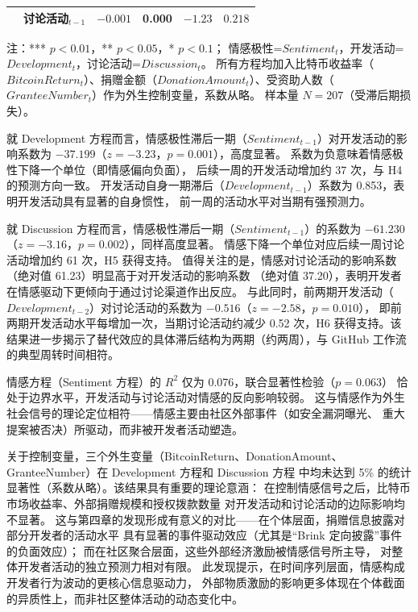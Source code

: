 \begin{table}[htbp]
\begin{tabularx}{\textwidth}{p{3.2cm}p{3.2cm}XXXX}
                      & 讨论活动$_{t-1}$   & $-0.001$ & 0.000 & $-1.23$ & $0.218$ \\
        \bottomrule
    \end{tabularx}
    \begin{minipage}{\textwidth}
        \vspace{0.3em}
        \footnotesize 注：*** $p < 0.01$，** $p < 0.05$，* $p < 0.1$；
              情感极性=$Sentiment_t$，开发活动=$Development_t$，讨论活动=$Discussion_t$。
              所有方程均加入比特币收益率（$BitcoinReturn_t$）、捐赠金额（$DonationAmount_t$）、受资助人数（$GranteeNumber_t$）作为外生控制变量，系数从略。
              样本量 $N = 207$（受滞后期损失）。
    \end{minipage}
\end{table}

就 Development 方程而言，情感极性滞后一期（$Sentiment_{t-1}$）对开发活动的影响系数为
$-37.199$（$z = -3.23$，$p = 0.001$），高度显著。
系数为负意味着情感极性下降一个单位（即情感偏向负面），
后续一周的开发活动增加约 37 次，与 H4 的预测方向一致。
开发活动自身一期滞后（$Development_{t-1}$）系数为 0.853，表明开发活动具有显著的自身惯性，
前一周的活动水平对当期有强预测力。

就 Discussion 方程而言，情感极性滞后一期（$Sentiment_{t-1}$）的系数为
$-61.230$（$z = -3.16$，$p = 0.002$），同样高度显著。
情感下降一个单位对应后续一周讨论活动增加约 61 次，H5 获得支持。
值得关注的是，情感对讨论活动的影响系数（绝对值 61.23）明显高于对开发活动的影响系数
（绝对值 37.20），表明开发者在情感驱动下更倾向于通过讨论渠道作出反应。
与此同时，前两期开发活动（$Development_{t-2}$）对讨论活动的系数为
$-0.516$（$z = -2.58$，$p = 0.010$），
即前两期开发活动水平每增加一次，当期讨论活动约减少 0.52 次，H6 获得支持。该结果进一步揭示了替代效应的具体滞后结构为两期（约两周），与 GitHub 工作流的典型周转时间相符。

情感方程（Sentiment 方程）的 $R^2$ 仅为 0.076，联合显著性检验（$p = 0.063$）
恰处于边界水平，开发活动与讨论活动对情感的反向影响较弱。
这与情感作为外生社会信号的理论定位相符——情感主要由社区外部事件（如安全漏洞曝光、
重大提案被否决）所驱动，而非被开发者活动塑造。

关于控制变量，三个外生变量（BitcoinReturn、DonationAmount、GranteeNumber）在 Development 方程和 Discussion 方程
中均未达到 5\% 的统计显著性（系数从略）。该结果具有重要的理论意涵：
在控制情感信号之后，比特币市场收益率、外部捐赠规模和授权拨款数量
对开发活动和讨论活动的边际影响均不显著。
这与第四章的发现形成有意义的对比——在个体层面，捐赠信息披露对部分开发者的活动水平
具有显著的事件驱动效应（尤其是“Brink 定向披露”事件的负面效应）；
而在社区聚合层面，这些外部经济激励被情感信号所主导，
对整体开发者活动的独立预测力相对有限。
此发现提示，在时间序列层面，情感构成开发者行为波动的更核心信息驱动力，
外部物质激励的影响更多体现在个体截面的异质性上，而非社区整体活动的动态变化中。

